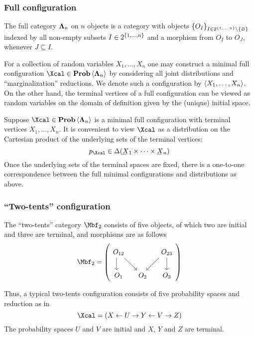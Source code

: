 \subsubsection{Full configuration}\label{s:config-examples-full}
  The full category $\bm\Lambda_{n}$ on $n$ objects is a category with
  objects $\left\{O_{I}\right\}_{I\in
    2^{\left\{1,\ldots,n\right\}}\setminus\left\{\varnothing\right\}}$ indexed by all
  non-empty subsets $I\in 2^{\left\{1,\ldots,n\right\}}$ and a morphism from
  $O_{I}$ to $O_{J}$, whenever $J\subseteq I$.

  For a collection of random variables $X_{1},\ldots,X_{n}$ one may
  construct a minimal full configuration $\Xcal\in\prob\<\Lambdabf_{n}>$ by
  considering all joint distributions and ``marginalization''
  reductions. We denote such a configuration by
  $\<X_{1},\ldots,X_{n}>$. 
  On the other hand, the terminal
  vertices of a full configuration can be viewed as random variables
  on the domain of definition given by the (unique) initial space.
  
  Suppose $\Xcal\in\prob\<\Lambdabf_{n}>$ is a minimal full
  configuration with terminal vertices $X_{1},\ldots,X_{n}$. It is
  convenient to view $\Xcal$ as a distribution on the Cartesian
  product of the underlying sets of the terminal vertices:
  \[
    p_{\Xcal}\in\Delta(\un X_{1}\times\cdots\times\un X_{n})
  \]
  Once the underlying sets of the terminal spaces are fixed, there is
  a one-to-one correspondence between the full minimal configurations
  and distributions as above.

\subsubsection{``Two-tents'' configuration}
\label{s:config-examples-twotents}
  The ``two-tents'' category $\Mbf_{2}$ consists of five objects, of
  which two are initial and three are terminal, and morphisms are as
  follows
  \[
  \Mbf_{2}=
  \left(
  \begin{tikzcd}[column sep=small,ampersand replacement=\&]
  O_{12}
  \arrow[xshift=-0.3em]{d}{}
  \arrow{dr}{} 
  \&
  \&
  O_{23} 
  \arrow[xshift=-0.3em]{dl}{}
  \arrow{d}{}
  \\
  O_1 
  \&
  O_2
  \&
  O_3
  \end{tikzcd}
  \right)
  \]
  
  Thus, a typical two-tents configuration consists of five probability
  spaces and reduction as in
  \[
    \Xcal=(X\ot U\to Y\ot V\to Z)
  \]
  The probability spaces $U$ and $V$ are initial and $X$, $Y$ and $Z$
  are terminal.
 
